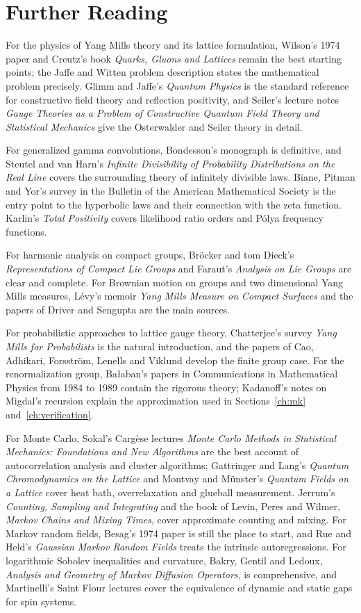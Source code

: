 \chapter{Further Reading}

For the physics of Yang Mills theory and its lattice formulation, Wilson's 1974 paper and Creutz's book \emph{Quarks, Gluons and Lattices} remain the best starting points; the Jaffe and Witten problem description states the mathematical problem precisely. Glimm and Jaffe's \emph{Quantum Physics} is the standard reference for constructive field theory and reflection positivity, and Seiler's lecture notes \emph{Gauge Theories as a Problem of Constructive Quantum Field Theory and Statistical Mechanics} give the Osterwalder and Seiler theory in detail.

For generalized gamma convolutions, Bondesson's monograph is definitive, and Steutel and van Harn's \emph{Infinite Divisibility of Probability Distributions on the Real Line} covers the surrounding theory of infinitely divisible laws. Biane, Pitman and Yor's survey in the Bulletin of the American Mathematical Society is the entry point to the hyperbolic laws and their connection with the zeta function. Karlin's \emph{Total Positivity} covers likelihood ratio orders and P\'olya frequency functions.

For harmonic analysis on compact groups, Br\"ocker and tom Dieck's \emph{Representations of Compact Lie Groups} and Faraut's \emph{Analysis on Lie Groups} are clear and complete. For Brownian motion on groups and two dimensional Yang Mills measures, L\'evy's memoir \emph{Yang Mills Measure on Compact Surfaces} and the papers of Driver and Sengupta are the main sources.

For probabilistic approaches to lattice gauge theory, Chatterjee's survey \emph{Yang Mills for Probabilists} is the natural introduction, and the papers of Cao, Adhikari, Forsstr\"om, Lenells and Viklund develop the finite group case. For the renormalization group, Ba\l aban's papers in Communications in Mathematical Physics from 1984 to 1989 contain the rigorous theory; Kadanoff's notes on Migdal's recursion explain the approximation used in Sections~\ref{ch:mk} and~\ref{ch:verification}.

For Monte Carlo, Sokal's Carg\`ese lectures \emph{Monte Carlo Methods in Statistical Mechanics: Foundations and New Algorithms} are the best account of autocorrelation analysis and cluster algorithms; Gattringer and Lang's \emph{Quantum Chromodynamics on the Lattice} and Montvay and M\"unster's \emph{Quantum Fields on a Lattice} cover heat bath, overrelaxation and glueball measurement. Jerrum's \emph{Counting, Sampling and Integrating} and the book of Levin, Peres and Wilmer, \emph{Markov Chains and Mixing Times}, cover approximate counting and mixing. For Markov random fields, Besag's 1974 paper is still the place to start, and Rue and Held's \emph{Gaussian Markov Random Fields} treats the intrinsic autoregressions. For logarithmic Sobolev inequalities and curvature, Bakry, Gentil and Ledoux, \emph{Analysis and Geometry of Markov Diffusion Operators}, is comprehensive, and Martinelli's Saint Flour lectures cover the equivalence of dynamic and static gaps for spin systems.

